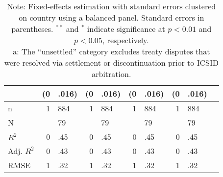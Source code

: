 \documentclass[12pt,onesided]{amsart}
\begin{document}
\begin{table}[ht]
\begin{tabular}{lr@{} lr@{}lr@{}lr@{}lr@{}}
   & (0&.016) & (0&.016) & (0&.016) & (0&.016) \\ 
   \hline
n & 1&884 & 1&884 & 1&884 & 1&884 \\ 
  N && 79 && 79 && 79 && 79 \\ 
  $R^{2}$ & 0&.45 & 0&.45 & 0&.45 & 0&.45 \\ 
  Adj. $R^{2}$ & 0&.43 & 0&.43 & 0&.43 & 0&.43 \\ 
  RMSE & 1&.32 & 1&.32 & 1&.32 & 1&.32 \\ 
   \hline
\hline
\end{tabular}
\caption*{Note: Fixed-effects estimation with standard errors clustered on country using a balanced panel. Standard errors in parentheses. $^{**}$ and $^{*}$ indicate significance at $p<0.01$ and $p<0.05$, respectively. \\ a: The ``unsettled'' category excludes treaty disputes that were resolved via settlement or discontinuation prior to ICSID arbitration.}
\end{table}

\newpage

\end{document}
